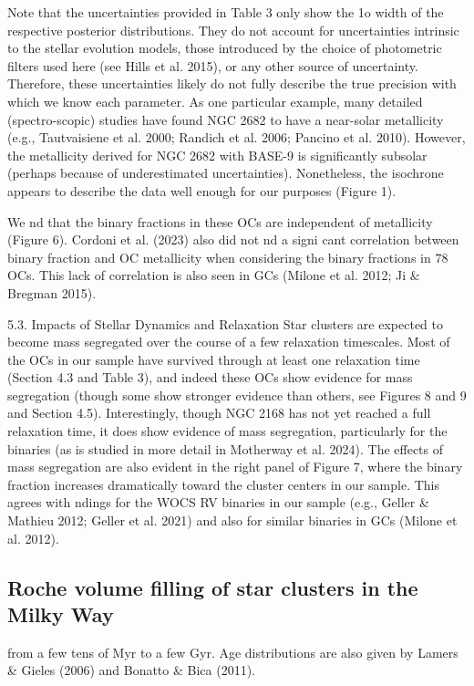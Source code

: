 \documentclass[../main.tex]{subfiles}
\begin{document}
Note that the uncertainties provided in Table 3 only show the 1o width of the respective posterior distributions. They do not account for uncertainties intrinsic to the stellar evolution models, those introduced by the choice of photometric filters used here (see Hills et al. 2015), or any other source of uncertainty. Therefore, these uncertainties likely do not fully describe the true precision with which we know each parameter. As one particular example, many detailed (spectro-scopic) studies have found NGC 2682 to have a near-solar metallicity (e.g., Tautvaisiene et al. 2000; Randich et al. 2006;
Pancino et al. 2010). However, the metallicity derived for NGC 2682 with BASE-9 is significantly subsolar (perhaps because of underestimated uncertainties). Nonetheless, the isochrone appears to describe the data well enough for our purposes (Figure 1).

We nd that the binary fractions in these OCs are
independent of metallicity (Figure 6). Cordoni et al. (2023)
also did not nd a signi cant correlation between binary
fraction and OC metallicity when considering the binary
fractions in 78 OCs. This lack of correlation is also seen in GCs
(Milone et al. 2012; Ji & Bregman 2015).

5.3. Impacts of Stellar Dynamics and Relaxation
Star clusters are expected to become mass segregated over
the course of a few relaxation timescales. Most of the OCs in
our sample have survived through at least one relaxation time
(Section 4.3 and Table 3), and indeed these OCs show evidence for mass segregation (though some show stronger evidence
than others, see Figures 8 and 9 and Section 4.5). Interestingly,
though NGC 2168 has not yet reached a full relaxation time, it
does show evidence of mass segregation, particularly for the
binaries (as is studied in more detail in Motherway et al. 2024).
The effects of mass segregation are also evident in the right
panel of Figure 7, where the binary fraction increases
dramatically toward the cluster centers in our sample. This
agrees with ndings for the WOCS RV binaries in our sample
(e.g., Geller & Mathieu 2012; Geller et al. 2021) and also for
similar binaries in GCs (Milone et al. 2012).

\subsection{Roche volume filling of star clusters in the Milky Way}

from a few tens of Myr to a few Gyr. Age distributions are also
given by Lamers & Gieles (2006) and Bonatto & Bica (2011).
\end{document}
